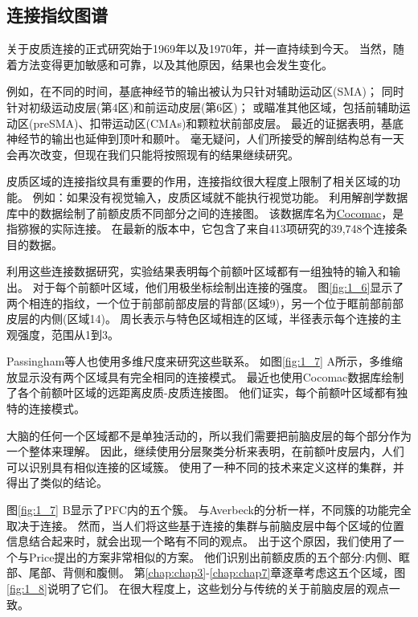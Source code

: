 \subsection{连接指纹图谱}
关于皮质连接的正式研究始于1969年\cite{pandya1969cortico}以及1970年\cite{jones1970anatomical}，并一直持续到今天。
当然，随着方法变得更加敏感和可靠，以及其他原因，结果也会发生变化。
\par
例如，在不同的时间，基底神经节的输出被认为只针对辅助运动区(SMA)\cite{schell1984origin}；
同时针对初级运动皮层(第4区)和前运动皮层(第6区)\cite{kemp1971connexions}；
或瞄准其他区域，包括前辅助运动区(preSMA)、扣带运动区(CMAs)和颗粒状前部皮层\cite{matelli1996thalamic,mcfarland2002thalamic}。
最近的证据表明，基底神经节的输出也延伸到顶叶\cite{clower2005basal}和颞叶\cite{middleton1996temporal}。
毫无疑问，人们所接受的解剖结构总有一天会再次改变，但现在我们只能将按照现有的结果继续研究。
\par
皮质区域的连接指纹具有重要的作用，连接指纹很大程度上限制了相关区域的功能。
例如：如果没有视觉输入，皮质区域就不能执行视觉功能。
利用解剖学数据库中的数据绘制了前额皮质不同部分之间的连接图\cite{2002Dorsal}。
该数据库名为\href{http://www.cocomac.org/}{Cocomac}，是指猕猴的实际连接。
在最新的版本中，它包含了来自413项研究的39,748个连接条目的数据。
\par
利用这些连接数据研究\cite{2002Dorsal}，实验结果表明每个前额叶区域都有一组独特的输入和输出。
对于每个前额叶区域，他们用极坐标绘制出连接的强度。
图\ref{fig:1_6}显示了两个相连的指纹，一个位于前部前部皮层的背部(区域9)，另一个位于眶前部前部皮层的内侧(区域14)。
周长表示与特色区域相连的区域，半径表示每个连接的主观强度，范围从1到3。

\par
Passingham等人也使用多维尺度来研究这些联系\cite{2002Dorsal}。
如图\ref{fig:1_7} A所示，多维缩放显示没有两个区域具有完全相同的连接模式。
最近也使用Cocomac数据库绘制了各个前额叶区域的远距离皮质-皮质连接图\cite{averbeck2008statistical}。
他们证实，每个前额叶区域都有独特的连接模式。

\par
大脑的任何一个区域都不是单独活动的，所以我们需要把前脑皮层的每个部分作为一个整体来理解。
因此，继续使用分层聚类分析来表明\cite{2002Dorsal}，在前额叶皮层内，人们可以识别具有相似连接的区域簇。
使用了一种不同的技术来定义这样的集群，并得出了类似的结论\cite{averbeck2008statistical}。

\par
图\ref{fig:1_7} B显示了PFC内的五个簇\cite{2002Dorsal}。
与Averbeck\cite{averbeck2008statistical}的分析一样，不同簇的功能完全取决于连接。
然而，当人们将这些基于连接的集群与前脑皮层中每个区域的位置信息结合起来时，就会出现一个略有不同的观点。
出于这个原因，我们使用了一个与Price\cite{price2010neurocircuitry}提出的方案非常相似的方案。
他们识别出前额皮质的五个部分:内侧、眶部、尾部、背侧和腹侧。
第\ref{chap:chap3}-\ref{chap:chap7}章逐章考虑这五个区域，图\ref{fig:1_8}说明了它们。
在很大程度上，这些划分与传统的关于前脑皮层的观点一致。

